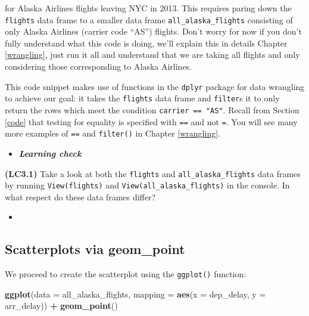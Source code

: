 \documentclass[12pt,]{krantz}
\makeatletter
\newenvironment{Shaded}{\begin{snugshade}}{\end{snugshade}}
\newcommand{\KeywordTok}[1]{\textcolor[rgb]{0.27,0.27,0.27}{\textbf{#1}}}
\newcommand{\DataTypeTok}[1]{\textcolor[rgb]{0.27,0.27,0.27}{#1}}
\newcommand{\StringTok}[1]{\textcolor[rgb]{0.5,0.5,0.5}{#1}}
\newcommand{\OperatorTok}[1]{\textcolor[rgb]{0.43,0.43,0.43}{\textbf{#1}}}
\newcommand{\NormalTok}[1]{#1}
\newenvironment{kframe}{%
\medskip{}
\setlength{\fboxsep}{.8em}
 \def\at@end@of@kframe{}%
 \ifinner\ifhmode%
  \def\at@end@of@kframe{\end{minipage}}%
  \begin{minipage}{\columnwidth}%
 \fi\fi%
 \def\FrameCommand##1{\hskip\@totalleftmargin \hskip-\fboxsep
 \colorbox{shadecolor}{##1}\hskip-\fboxsep
     \hskip-\linewidth \hskip-\@totalleftmargin \hskip\columnwidth}%
 \MakeFramed {\advance\hsize-\width
   \@totalleftmargin\z@ \linewidth\hsize
   \@setminipage}}%
 {\par\unskip\endMakeFramed%
 \at@end@of@kframe}
\renewenvironment{Shaded}{\begin{kframe}}{\end{kframe}}
\newenvironment{rmdblock}[1]
  {\begin{shaded*}
  \begin{itemize}
  \renewcommand{\labelitemi}{
    \raisebox{-.7\height}[0pt][0pt]{
    }
  }
  \item
  }
  {
  \end{itemize}
  \end{shaded*}
  }
\newenvironment{learncheck}
  {\begin{rmdblock}{warning}}
  {\end{rmdblock}}
\theoremstyle{definition}
\theoremstyle{definition}
\theoremstyle{definition}
\theoremstyle{remark}
\makeatother
\begin{document}
for Alaska Airlines flights leaving NYC in 2013. This requires paring
down the \texttt{flights} data frame to a smaller data frame
\texttt{all\_alaska\_flights} consisting of only Alaska Airlines
(carrier code ``AS'') flights. Don't worry for now if you don't fully
understand what this code is doing, we'll explain this in details
Chapter \ref{wrangling}, just run it all and understand that we are
taking all flights and only considering those corresponding to Alaska
Airlines.

\begin{Shaded}
\end{Shaded}

This code snippet makes use of functions in the \texttt{dplyr} package
for data wrangling to achieve our goal: it takes the \texttt{flights}
data frame and \texttt{filter}s it to only return the rows which meet
the condition \texttt{carrier\ ==\ "AS"}. Recall from Section \ref{code}
that testing for equality is specified with \texttt{==} and not
\texttt{=}. You will see many more examples of \texttt{==} and
\texttt{filter()} in Chapter \ref{wrangling}.

\begin{learncheck}
\textbf{\emph{Learning check}}
\end{learncheck}

\textbf{(LC3.1)} Take a look at both the \texttt{flights} and
\texttt{all\_alaska\_flights} data frames by running
\texttt{View(flights)} and \texttt{View(all\_alaska\_flights)} in the
console. In what respect do these data frames differ?

\begin{learncheck}

\end{learncheck}

\subsection{Scatterplots via geom\_point}\label{geompoint}

We proceed to create the scatterplot using the \texttt{ggplot()}
function:

\begin{Shaded}
\begin{Highlighting}[]
\KeywordTok{ggplot}\NormalTok{(}\DataTypeTok{data =}\NormalTok{ all_alaska_flights, }
       \DataTypeTok{mapping =} \KeywordTok{aes}\NormalTok{(}\DataTypeTok{x =}\NormalTok{ dep_delay, }\DataTypeTok{y =}\NormalTok{ arr_delay)) }\OperatorTok{+}\StringTok{ }
\StringTok{  }\KeywordTok{geom_point}\NormalTok{()}
\end{Highlighting}
\end{Shaded}
\end{document}

